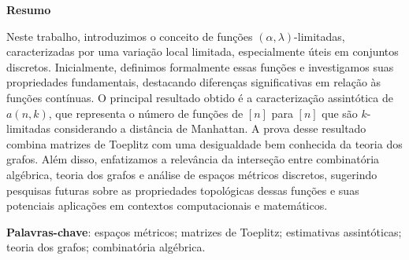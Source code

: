 \begin{center}
  \large \textbf{Resumo}
\end{center}
\vspace{1cm}
\par Neste trabalho, introduzimos o conceito de funções $(\alpha, \lambda)$-limitadas, caracterizadas por uma variação local limitada, especialmente úteis em conjuntos discretos. Inicialmente, definimos formalmente essas funções e investigamos suas propriedades fundamentais, destacando diferenças significativas em relação às funções contínuas. O principal resultado obtido é a caracterização assintótica de $a(n, k)$, que representa o número de funções de $[n]$ para $[n]$ que são $k$-limitadas considerando a distância de Manhattan. A prova desse resultado combina matrizes de Toeplitz com uma desigualdade bem conhecida da teoria dos grafos. Além disso, enfatizamos a relevância da interseção entre combinatória algébrica, teoria dos grafos e análise de espaços métricos discretos, sugerindo pesquisas futuras sobre as propriedades topológicas dessas funções e suas potenciais aplicações em contextos computacionais e matemáticos.

\vspace{1cm}

\begin{raggedleft}
  \textbf{Palavras-chave}: espaços métricos; matrizes de Toeplitz; estimativas assintóticas; teoria dos grafos; combinatória algébrica.
\end{raggedleft}
